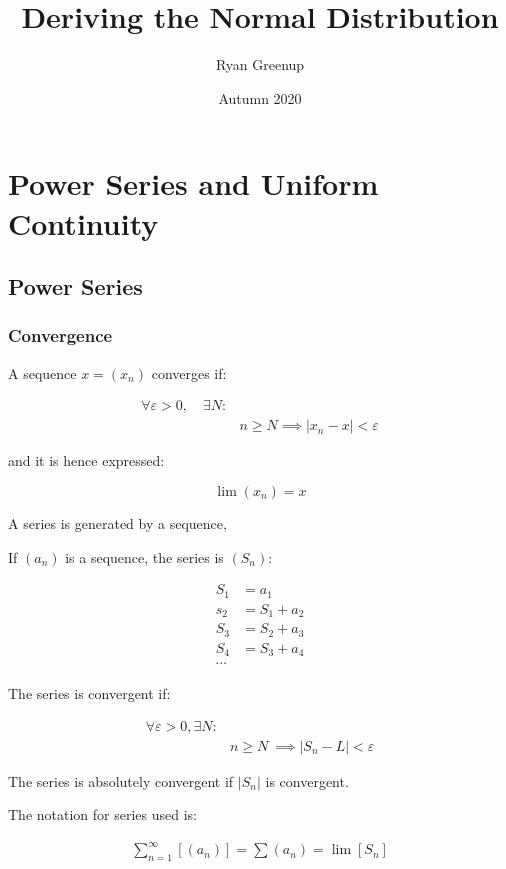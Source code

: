 \documentclass[class=article, crop=false]{standalone}
\title{Deriving the Normal Distribution}
\author{Ryan Greenup}
\date{Autumn 2020}
\begin{document}
\hypertarget{power-series-and-uniform-continuity}{%
\section{Power Series and Uniform
Continuity}\label{power-series-and-uniform-continuity}}

\hypertarget{power-series}{%
\subsection{Power Series}\label{power-series}}

\hypertarget{convergence}{%
\subsubsection{Convergence}\label{convergence}}

A sequence \(x=(x_n)\) converges if:

\begin{align*}
\forall \varepsilon > 0, \quad \exists N:&
\ \\
&n \geq N \implies |x_n - x | < \varepsilon
\end{align*}

and it is hence expressed:

\[
\lim(x_n) = x
\]

A series is generated by a sequence,

If \((a_n)\) is a sequence, the series is \((S_n)\):

\begin{align*}
S_1 &= a_1 \\
s_2&= S_1 +  a_2 \\
S_3&= S_2 +  a_3\\
S_4&= S_3+ a_4\\
\cdots
\end{align*}

The series is convergent if:

\begin{align*}
  \forall \varepsilon > 0, \exists N:&\\
&  n \geq N \ \implies    \left| S_n - L \right|  < \varepsilon
\end{align*}

The series is absolutely convergent if $\left\lvert S_n \right\rvert$ is convergent.

The notation for series used is:

\begin{align*}
\sum^{\infty}_{n=1} \left[ \left( a_n \right)  \right] = \sum \left( a_n \right) = \lim_{}\left[ S_n \right]
\end{align*}
\end{document}
